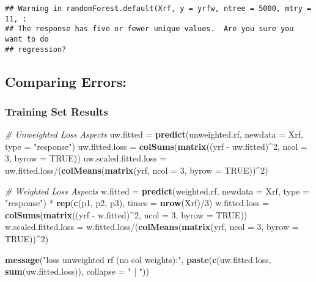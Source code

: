 \documentclass[10pt]{report}
\newenvironment{Shaded}{}{}
\newcommand{\KeywordTok}[1]{\textcolor[rgb]{0.00,0.44,0.13}{\textbf{{#1}}}}
\newcommand{\DataTypeTok}[1]{\textcolor[rgb]{0.56,0.13,0.00}{{#1}}}
\newcommand{\DecValTok}[1]{\textcolor[rgb]{0.25,0.63,0.44}{{#1}}}
\newcommand{\StringTok}[1]{\textcolor[rgb]{0.25,0.44,0.63}{{#1}}}
\newcommand{\CommentTok}[1]{\textcolor[rgb]{0.38,0.63,0.69}{\textit{{#1}}}}
\newcommand{\OtherTok}[1]{\textcolor[rgb]{0.00,0.44,0.13}{{#1}}}
\newcommand{\NormalTok}[1]{{#1}}
\begin{document}
\begin{verbatim}
## Warning in randomForest.default(Xrf, y = yrfw, ntree = 5000, mtry = 11, :
## The response has five or fewer unique values.  Are you sure you want to do
## regression?
\end{verbatim}

\subsection{Comparing Errors:}\label{comparing-errors}

\subsubsection{Training Set Results}\label{training-set-results}

\begin{Shaded}
\begin{Highlighting}[]
\CommentTok{# Unweighted Loss Aspects}
\NormalTok{uw.fitted =}\StringTok{ }\KeywordTok{predict}\NormalTok{(unweighted.rf, }\DataTypeTok{newdata =} \NormalTok{Xrf, }\DataTypeTok{type =} \StringTok{"response"}\NormalTok{)}
\NormalTok{uw.fitted.loss =}\StringTok{ }\KeywordTok{colSums}\NormalTok{(}\KeywordTok{matrix}\NormalTok{((yrf -}\StringTok{ }\NormalTok{uw.fitted)^}\DecValTok{2}\NormalTok{, }\DataTypeTok{ncol =} \DecValTok{3}\NormalTok{, }\DataTypeTok{byrow =} \OtherTok{TRUE}\NormalTok{))}
\NormalTok{uw.scaled.fitted.loss =}\StringTok{ }\NormalTok{uw.fitted.loss/(}\KeywordTok{colMeans}\NormalTok{(}\KeywordTok{matrix}\NormalTok{(yrf, }\DataTypeTok{ncol =} \DecValTok{3}\NormalTok{, }\DataTypeTok{byrow =} \OtherTok{TRUE}\NormalTok{))^}\DecValTok{2}\NormalTok{)}

\CommentTok{# Weighted Loss Aspects}
\NormalTok{w.fitted =}\StringTok{ }\KeywordTok{predict}\NormalTok{(weighted.rf, }\DataTypeTok{newdata =} \NormalTok{Xrf, }\DataTypeTok{type =} \StringTok{"response"}\NormalTok{) *}\StringTok{ }\KeywordTok{rep}\NormalTok{(}\KeywordTok{c}\NormalTok{(p1, }
    \NormalTok{p2, p3), }\DataTypeTok{times =} \KeywordTok{nrow}\NormalTok{(Xrf)/}\DecValTok{3}\NormalTok{)}
\NormalTok{w.fitted.loss =}\StringTok{ }\KeywordTok{colSums}\NormalTok{(}\KeywordTok{matrix}\NormalTok{((yrf -}\StringTok{ }\NormalTok{w.fitted)^}\DecValTok{2}\NormalTok{, }\DataTypeTok{ncol =} \DecValTok{3}\NormalTok{, }\DataTypeTok{byrow =} \OtherTok{TRUE}\NormalTok{))}
\NormalTok{w.scaled.fitted.loss =}\StringTok{ }\NormalTok{w.fitted.loss/(}\KeywordTok{colMeans}\NormalTok{(}\KeywordTok{matrix}\NormalTok{(yrf, }\DataTypeTok{ncol =} \DecValTok{3}\NormalTok{, }\DataTypeTok{byrow =} \OtherTok{TRUE}\NormalTok{))^}\DecValTok{2}\NormalTok{)}

\KeywordTok{message}\NormalTok{(}\StringTok{"loss unweighted rf (no col weights):"}\NormalTok{, }\KeywordTok{paste}\NormalTok{(}\KeywordTok{c}\NormalTok{(uw.fitted.loss, }\KeywordTok{sum}\NormalTok{(uw.fitted.loss)), }
    \DataTypeTok{collapse =} \StringTok{" | "}\NormalTok{))}
\end{Highlighting}
\end{Shaded}
\end{document}
